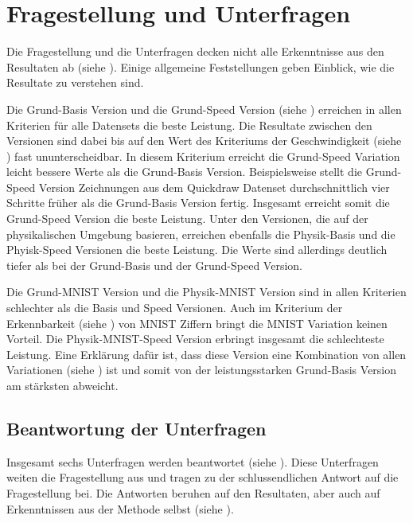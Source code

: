 		
	







 
 
\section{Fragestellung und Unterfragen}\label{chap:d_frage}
Die Fragestellung und die Unterfragen decken nicht alle Erkenntnisse aus den
Resultaten ab (siehe ). Einige allgemeine Feststellungen geben
Einblick, wie die Resultate zu verstehen sind.
 
Die Grund-Basis Version und die Grund-Speed Version (siehe
) erreichen in allen Kriterien für alle Datensets die
beste Leistung. Die Resultate zwischen den Versionen sind dabei bis auf den Wert
des Kriteriums der Geschwindigkeit (siehe ) fast
ununterscheidbar. In diesem Kriterium erreicht die Grund-Speed Variation leicht
bessere Werte als die Grund-Basis Version. Beispielsweise stellt die Grund-Speed
Version Zeichnungen aus dem Quickdraw Datenset durchschnittlich vier Schritte
früher als die Grund-Basis Version fertig. Insgesamt erreicht somit die
Grund-Speed Version die beste Leistung. Unter den Versionen, die auf der
physikalischen Umgebung basieren, erreichen ebenfalls die Physik-Basis und die
Phyisk-Speed Versionen die beste Leistung. Die Werte sind allerdings deutlich
tiefer als bei der Grund-Basis und der Grund-Speed Version.
 
Die Grund-MNIST Version und die Physik-MNIST Version sind in allen Kriterien
schlechter als die Basis und Speed Versionen. Auch im Kriterium der
Erkennbarkeit (siehe ) von MNIST Ziffern bringt die
MNIST Variation keinen Vorteil. Die Physik-MNIST-Speed Version erbringt
insgesamt die schlechteste Leistung. Eine Erklärung dafür ist, dass diese
Version eine Kombination von allen Variationen (siehe )
ist und somit von der leistungsstarken Grund-Basis Version am stärksten
abweicht.
 
 
\subsection{Beantwortung der Unterfragen}\label{sub:d_frage_unter}
Insgesamt sechs Unterfragen werden beantwortet (siehe ).
Diese Unterfragen weiten die Fragestellung aus und tragen zu der
schlussendlichen Antwort auf die Fragestellung bei. Die Antworten beruhen auf
den Resultaten, aber auch auf Erkenntnissen aus der Methode selbst (siehe
).
 
